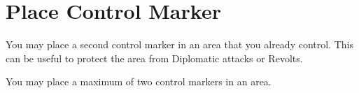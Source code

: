 \section{Place Control Marker}

You may place a second control marker in an area that you already control. This can be useful to protect the area from Diplomatic attacks or Revolts.

You may place a maximum of two control markers in an area.